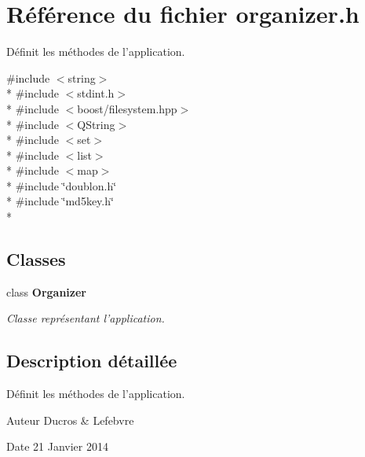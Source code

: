 \section{Référence du fichier organizer.\-h}
\label{organizer_8h}


Définit les méthodes de l'application.  


{\ttfamily \#include $<$string$>$}\\*
{\ttfamily \#include $<$stdint.\-h$>$}\\*
{\ttfamily \#include $<$boost/filesystem.\-hpp$>$}\\*
{\ttfamily \#include $<$Q\-String$>$}\\*
{\ttfamily \#include $<$set$>$}\\*
{\ttfamily \#include $<$list$>$}\\*
{\ttfamily \#include $<$map$>$}\\*
{\ttfamily \#include \char`\"{}doublon.\-h\char`\"{}}\\*
{\ttfamily \#include \char`\"{}md5key.\-h\char`\"{}}\\*
\subsection*{Classes}
\begin{DoxyCompactItemize}
\item 
class {\bf Organizer}
\begin{DoxyCompactList}\small\item\em Classe représentant l'application. \end{DoxyCompactList}\end{DoxyCompactItemize}


\subsection{Description détaillée}
Définit les méthodes de l'application. \begin{DoxyAuthor}{Auteur}
Ducros \& Lefebvre 
\end{DoxyAuthor}
\begin{DoxyDate}{Date}
21 Janvier 2014 
\end{DoxyDate}
